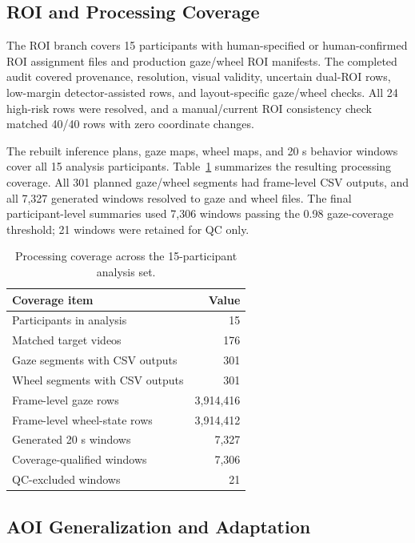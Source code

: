 \documentclass[sigconf,review,anonymous]{acmart}
\newcommand{\autouitablefont}{\footnotesize}
\begin{document}
\subsection{ROI and Processing Coverage}

The ROI branch covers 15 participants with human-specified or
human-confirmed ROI assignment files and production gaze/wheel ROI
manifests. The completed audit covered provenance, resolution, visual
validity, uncertain dual-ROI rows, low-margin detector-assisted rows, and
layout-specific gaze/wheel checks. All 24 high-risk rows were resolved,
and a manual/current ROI consistency check matched 40/40 rows with zero
coordinate changes.

The rebuilt inference plans, gaze maps, wheel maps, and 20 s behavior
windows cover all 15 analysis participants. Table~\ref{tab:coverage_refresh}
summarizes the resulting processing coverage. All 301 planned gaze/wheel
segments had frame-level CSV outputs, and all 7,327 generated windows
resolved to gaze and wheel files. The final participant-level summaries
used 7,306 windows passing the 0.98 gaze-coverage threshold; 21 windows
were retained for QC only.

\begin{table}[t]
\centering
\caption{Processing coverage across the 15-participant analysis set.}
\label{tab:coverage_refresh}
\autouitablefont
\begin{tabular}{lr}
\toprule
Coverage item & Value \\
\midrule
Participants in analysis & 15 \\
Matched target videos & 176 \\
Gaze segments with CSV outputs & 301 \\
Wheel segments with CSV outputs & 301 \\
Frame-level gaze rows & 3,914,416 \\
Frame-level wheel-state rows & 3,914,412 \\
Generated 20 s windows & 7,327 \\
Coverage-qualified windows & 7,306 \\
QC-excluded windows & 21 \\
\bottomrule
\end{tabular}
\end{table}

\subsection{AOI Generalization and Adaptation}
\end{document}
